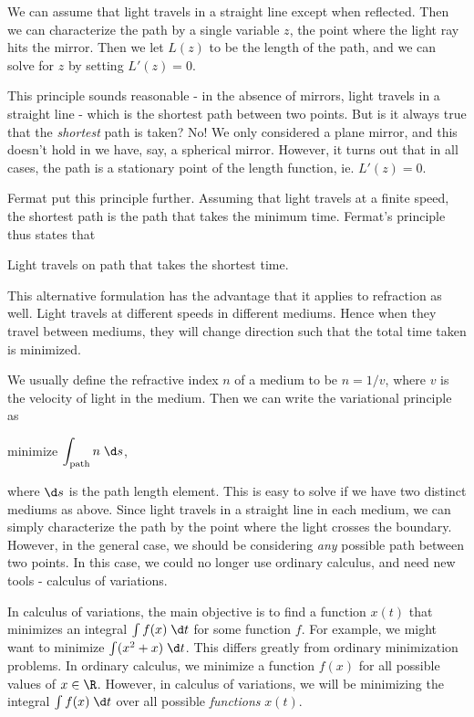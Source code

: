 \documentclass[a4paper]{article}
\begin{document}
We can assume that light travels in a straight line except when reflected. Then we can characterize the path by a single variable $z$, the point where the light ray hits the mirror. Then we let $L(z)$ to be the length of the path, and we can solve for $z$ by setting $L'(z) = 0$.

This principle sounds reasonable - in the absence of mirrors, light travels in a straight line - which is the shortest path between two points. But is it always true that the \emph{shortest} path is taken? No! We only considered a plane mirror, and this doesn't hold in we have, say, a spherical mirror. However, it turns out that in all cases, the path is a stationary point of the length function, ie. $L'(z) = 0$.

Fermat put this principle further. Assuming that light travels at a finite speed, the shortest path is the path that takes the minimum time. Fermat's principle thus states that
\begin{center}
  Light travels on path that takes the shortest time.
\end{center}
This alternative formulation has the advantage that it applies to refraction as well. Light travels at different speeds in different mediums. Hence when they travel between mediums, they will change direction such that the total time taken is minimized.

We usually define the refractive index $n$ of a medium to be $n = 1/v$, where $v$ is the velocity of light in the medium. Then we can write the variational principle as
\begin{center}
  minimize $\displaystyle \int_{\text{path}} n\;\d s$,
\end{center}
where $\d s$ is the path length element. This is easy to solve if we have two distinct mediums as above. Since light travels in a straight line in each medium, we can simply characterize the path by the point where the light crosses the boundary. However, in the general case, we should be considering \emph{any} possible path between two points. In this case, we could no longer use ordinary calculus, and need new tools - calculus of variations.

In calculus of variations, the main objective is to find a function $x(t)$ that minimizes an integral $\int f(x)\;\d t$ for some function $f$. For example, we might want to minimize $\int (x^2 + x)\;\d t$. This differs greatly from ordinary minimization problems. In ordinary calculus, we minimize a function $f(x)$ for all possible values of $x\in \R$. However, in calculus of variations, we will be minimizing the integral $\int f(x)\;\d t$ over all possible \emph{functions} $x(t)$.
\end{document}
